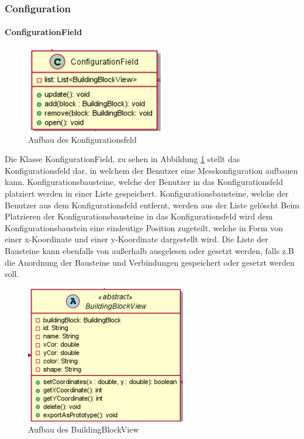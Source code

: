 \documentclass[parskip=full]{scrartcl}
\begin{document}
\subsubsection{Configuration}


\paragraph{ConfigurationField}

\begin{figure}[htbp]
	\begin{center}
		\includegraphics[width = 6cm]{Grafiken/View/ConfigurationField.png}
		\caption{Aufbau des Konfigurationsfeld}
		\label{Konfigurationsfeld}
	\end{center}
\end{figure}

Die Klasse KonfigurationField, zu sehen in Abbildung \ref{Konfigurationsfeld} stellt das Konfigurationsfeld dar, in welchem der Benutzer eine Messkonfiguration aufbauen kann.
Konfigurationsbausteine, welche der Benutzer in das Konfigurationsfeld platziert werden in einer Liste gespeichert. 
Konfigurationsbausteine, welche der Benutzer aus dem Konfigurationsfeld entfernt, werden aus der Liste gelöscht
Beim Platzieren der Konfigurationsbausteine in das Konfigurationsfeld wird dem Konfigurationsbaustein eine eindeutige Position zugeteilt, welche in Form von einer x-Koordinate und einer y-Koordinate dargestellt wird.
Die Liste der Bausteine kann ebenfalls von außerhalb ausgelesen oder gesetzt werden, falls z.B die Anordnung der Bausteine und Verbindungen gespeichert oder gesetzt werden soll.

\newpage

\begin{figure}[htbp]
	\begin{center}
		\includegraphics[width = 7cm]{Grafiken/View/BuildingBlockView.png}
		\caption{Aufbau des BuildingBlockView}
		\label{BuildingBlockView}
	\end{center}
\end{figure}
\end{document}

